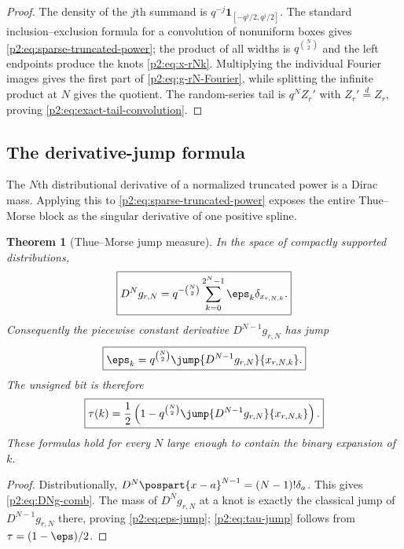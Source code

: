 \documentclass[11pt,oneside]{article}
\newtheorem{theorem}{Theorem}[section]
\theoremstyle{definition}
\begin{document}
\begin{proof}
The density of the $j$th summand is
$q^{-j}\mathbf1_{[-q^j/2,q^j/2]}$.  The standard inclusion--exclusion formula
for a convolution of nonuniform boxes gives
\eqref{p2:eq:sparse-truncated-power}; the product of all widths is
$q^{\binom N2}$ and the left endpoints produce the knots
\eqref{p2:eq:x-rNk}.  Multiplying the individual Fourier images gives the first
part of \eqref{p2:eq:g-rN-Fourier}, while splitting the infinite product at $N$
gives the quotient.  The random-series tail is
$q^NZ_r'$ with $Z_r'\overset d=Z_r$, proving
\eqref{p2:eq:exact-tail-convolution}.
\end{proof}

\subsection{The derivative-jump formula}

The $N$th distributional derivative of a normalized truncated power is a
Dirac mass.  Applying this to \eqref{p2:eq:sparse-truncated-power} exposes the
entire Thue--Morse block as the singular derivative of one positive spline.

\begin{theorem}[Thue--Morse jump measure]
\label{p2:thm:TM-jump-measure}
In the space of compactly supported distributions,
\begin{equation}
 \boxed{\displaystyle
 D^Ng_{r,N}=q^{-\binom N2}
   \sum_{k=0}^{2^N-1}\eps_k\delta_{x_{r,N,k}}.}            \label{p2:eq:DNg-comb}
\end{equation}
Consequently the piecewise constant derivative $D^{N-1}g_{r,N}$ has jump
\begin{equation}
 \boxed{\displaystyle
 \eps_k=q^{\binom N2}
 \jump{D^{N-1}g_{r,N}}{x_{r,N,k}}.}                       \label{p2:eq:eps-jump}
\end{equation}
The unsigned bit is therefore
\begin{equation}
 \boxed{\displaystyle
 \tau(k)=\frac12\left(1-q^{\binom N2}
 \jump{D^{N-1}g_{r,N}}{x_{r,N,k}}\right).}                \label{p2:eq:tau-jump}
\end{equation}
These formulas hold for every $N$ large enough to contain the binary expansion
of $k$.
\end{theorem}

\begin{proof}
Distributionally,
$D^N\pospart{x-a}^{N-1}=(N-1)!\delta_a$.
This gives \eqref{p2:eq:DNg-comb}.  The mass of $D^Ng_{r,N}$ at a knot is exactly
the classical jump of $D^{N-1}g_{r,N}$ there, proving
\eqref{p2:eq:eps-jump}; \eqref{p2:eq:tau-jump} follows from
$\tau=(1-\eps)/2$.
\end{proof}
\end{document}

